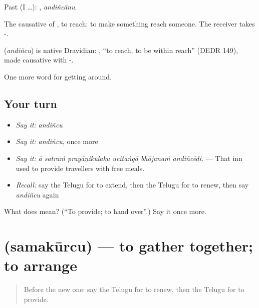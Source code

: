 Past (I …): , \emph{andiñcānu}.

The causative of , to reach: to make something reach someone. The receiver takes -.

\begin{cousinweb}
\textbf{} (\emph{andiñcu}) is native Dravidian: , \textquotedblleft{}to reach, to be within reach\textquotedblright{} (DEDR 149), made causative with -.
\end{cousinweb}

\begin{grammarlens}[title={What you've built}]
One more word for getting around.
\end{grammarlens}

\subsection*{Your turn}
\begin{itemize}
\raggedright
  \item \emph{Say it:} \emph{andiñcu}
  \item \emph{Say it:} \emph{andiñcu}, once more
  \item \emph{Say it:} \emph{ā satraṁ prayāṇikulaku ucitaṅgā bhōjanaṁ andiñcēdi.} — That inn used to provide travellers with free meals.
  \item \emph{Recall:} say the Telugu for to extend, then the Telugu for to renew, then say \emph{andiñcu} again
\end{itemize}

\begin{tcolorbox}[breakable,colback=teal!4,colframe=teal!35!black,title={Before you move on}]
What does  mean? (\textquotedblleft{}To provide; to hand over\textquotedblright{}.) Say it once more.
\end{tcolorbox}
\section[\texorpdfstring{\te{సమకూర్చు} (samakūrcu)}{సమకూర్చు (samakūrcu)}]{ (samakūrcu) — to gather together; to arrange}

\label{lesson:TE-C464-samakurcu}



\begin{quote}
Before the new one: say the Telugu for to renew, then the Telugu for to provide.
\end{quote}


